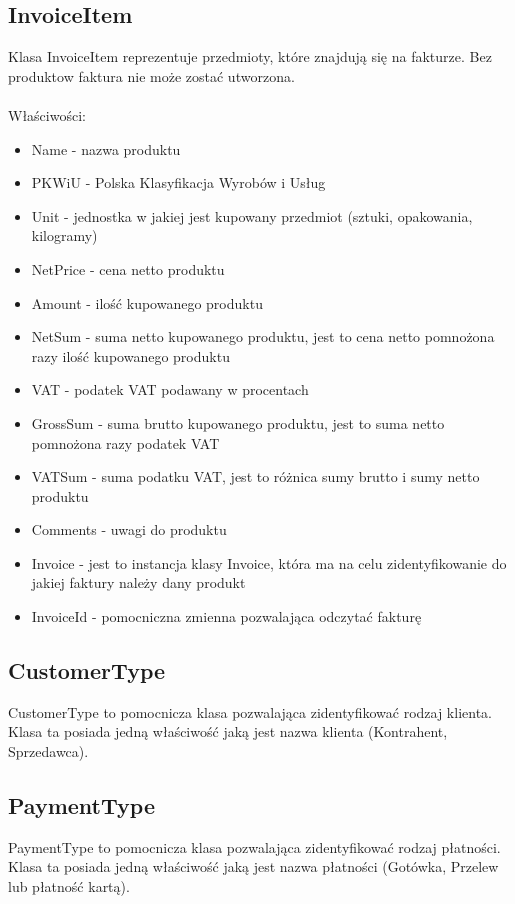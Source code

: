 \subsection{InvoiceItem}
Klasa InvoiceItem reprezentuje przedmioty, które znajdują się na fakturze. Bez produktow faktura nie może zostać utworzona.
\\\\
Właściwości:
\begin{itemize}
    \item Name - nazwa produktu
    \item PKWiU - Polska Klasyfikacja Wyrobów i Usług
    \item Unit - jednostka w jakiej jest kupowany przedmiot (sztuki, opakowania, kilogramy)
    \item NetPrice - cena netto produktu
    \item Amount - ilość kupowanego produktu
    \item NetSum - suma netto kupowanego produktu, jest to cena netto pomnożona razy ilość kupowanego produktu
    \item VAT - podatek VAT podawany w procentach
    \item GrossSum - suma brutto kupowanego produktu, jest to suma netto pomnożona razy podatek VAT
    \item VATSum - suma podatku VAT, jest to różnica sumy brutto i sumy netto produktu
    \item Comments - uwagi do produktu
    \item Invoice - jest to instancja klasy Invoice, która ma na celu zidentyfikowanie do jakiej faktury należy dany produkt
    \item InvoiceId - pomocniczna zmienna pozwalająca odczytać fakturę
\end{itemize}

\subsection{CustomerType}
CustomerType to pomocnicza klasa pozwalająca zidentyfikować rodzaj klienta. Klasa ta posiada jedną właściwość jaką jest nazwa klienta (Kontrahent, Sprzedawca).

\subsection{PaymentType}
PaymentType to pomocnicza klasa pozwalająca zidentyfikować rodzaj płatności. Klasa ta posiada jedną właściwość jaką jest nazwa płatności (Gotówka, Przelew lub płatność kartą).


